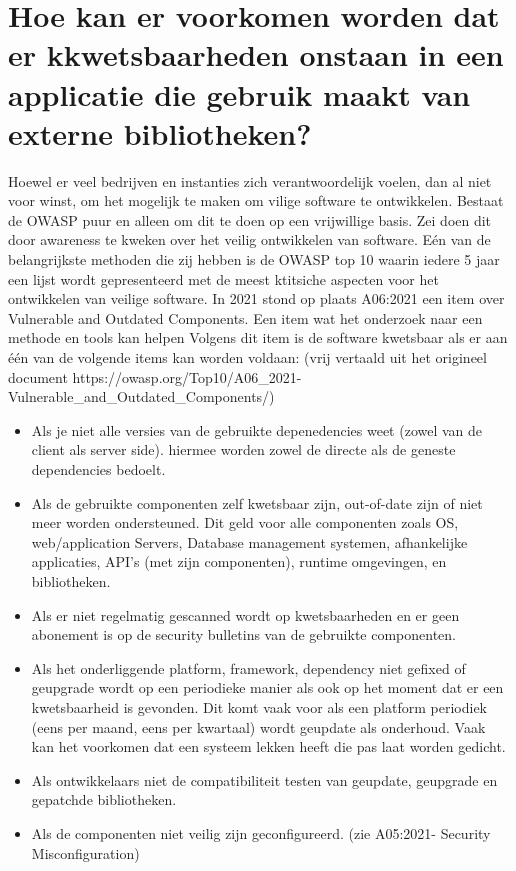 \section{Hoe kan er voorkomen worden dat er kkwetsbaarheden onstaan in een applicatie die gebruik maakt van externe bibliotheken?}\label{sec:hoe-kan-er-voorkomen-worden-dat-er-kkwetsbaarheden-onstaan-in-een-applicatie-die-gebruik-maakt-van-externe-bibliotheken?}
Hoewel er veel bedrijven en instanties zich verantwoordelijk voelen, dan al niet voor winst, om het mogelijk te maken om vilige software te ontwikkelen. Bestaat de OWASP puur en alleen om dit te doen op een vrijwillige basis. Zei doen dit door awareness te kweken over het veilig ontwikkelen van software. Eén van de belangrijkste methoden die zij hebben is de OWASP top 10 waarin iedere 5 jaar een lijst wordt gepresenteerd met de meest ktitsiche aspecten voor het ontwikkelen van veilige software. In 2021 stond op plaats A06:2021 een item over Vulnerable and Outdated Components. Een item wat het onderzoek naar een methode en tools kan helpen Volgens dit item is de software kwetsbaar als er aan één van de volgende items kan worden voldaan: (vrij vertaald uit het origineel document https://owasp.org/Top10/A06\_2021-Vulnerable\_and\_Outdated\_Components/)
\begin{itemize}
    \item Als je niet alle versies van de gebruikte depenedencies weet (zowel van de client als server side). hiermee worden zowel de directe als de geneste dependencies bedoelt.
    \item Als de gebruikte componenten zelf kwetsbaar zijn, out-of-date zijn of niet meer worden ondersteuned. Dit geld voor alle componenten zoals OS, web/application Servers, Database management systemen, afhankelijke applicaties, API's (met zijn componenten), runtime omgevingen, en bibliotheken.
    \item Als er niet regelmatig gescanned wordt op kwetsbaarheden en er geen abonement is op de security bulletins van de gebruikte componenten.
    \item Als het onderliggende platform, framework, dependency niet gefixed of geupgrade wordt op een periodieke manier als ook op het moment dat er een kwetsbaarheid is gevonden. Dit komt vaak voor als een platform periodiek (eens per maand, eens per kwartaal) wordt geupdate als onderhoud. Vaak kan het voorkomen dat een systeem lekken heeft die pas laat worden gedicht.
    \item Als ontwikkelaars niet de compatibiliteit testen van geupdate, geupgrade en gepatchde bibliotheken.
    \item Als de componenten niet veilig zijn geconfigureerd. (zie A05:2021- Security Misconfiguration)
\end{itemize}
